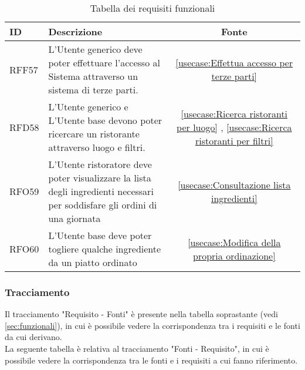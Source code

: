 \begin{table}[H]
	\renewcommand{\arraystretch}{1.5}
	\centering
	\begin{tabularx}{\textwidth}{l|X|c}
		\textbf{ID} & \textbf{Descrizione}                                                                                                    & \textbf{Fonte}                                                       \\
		\hline
		RFF57       & L'Utente generico deve poter effettuare l'accesso al Sistema attraverso un sistema di terze parti.                 	& \autoref{usecase:Effettua accesso per terze parti} \\
		\hline
		RFD58	   & L'Utente generico e L'Utente base devono poter ricercare un
		ristorante attraverso luogo e filtri.  					&
		\autoref{usecase:Ricerca ristoranti per luogo} , \autoref{usecase:Ricerca ristoranti per filtri} \\
		\hline
		RFO59	   & L'Utente ristoratore deve poter visualizzare la lista degli ingredienti necessari per soddisfare gli ordini di una giornata & \autoref{usecase:Consultazione lista ingredienti} \\ 
		\hline
		RFO60	   & L'Utente base deve poter togliere qualche ingrediente da un piatto ordinato & \autoref{usecase:Modifica della propria ordinazione} \\
		\end{tabularx}
	\caption{Tabella dei requisiti funzionali}
\end{table}

\newpage
\subsubsection{Tracciamento}
Il tracciamento "Requisito - Fonti" è presente nella tabella soprastante (vedi \autoref{sec:funzionali}), in cui è possibile vedere la corrispondenza tra i requisiti e le fonti da cui derivano.\\
La seguente tabella è relativa al tracciamento "Fonti - Requisito", in cui è possibile vedere la corrispondenza tra le fonti e i requisiti a cui fanno riferimento.\\


